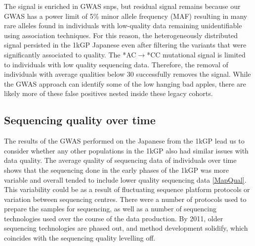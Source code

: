 \documentclass[9pt,lineno]{elife}
\begin{document}
The signal is enriched in GWAS snps, but residual signal remains because our GWAS has a power limit of 5\% minor allele frequency (MAF) resulting in many rare alleles found in individuals with low-quality data remaining unidentifiable using association techniques.
For this reason, the heterogeneously distributed signal persisted in the 1kGP Japanese even after filtering the variants that were significantly associated to quality.
The *AC${\rightarrow}$*CC mutational signal is limited to individuals with low quality sequencing data.
Therefore, the removal of individuals with average qualities below 30 successfully removes the signal.
While the GWAS approach can identify some of the low hanging bad apples, there are likely more of these false positives nested inside these legacy cohorts.


	\subsection{Sequencing quality over time}
The results of the GWAS performed on the Japanese from the 1kGP lead us to consider whether any other populations in the 1kGP also had similar issues with data quality.
The average quality of sequencing data of individuals over time shows that the sequencing done in the early phases of the 1kGP was more variable and overall tended to include lower quality sequencing data \ref{MapQual}.
This variability could be as a result of fluctuating sequence platform protocols or variation between sequencing centres.
There were a number of protocols used to prepare the samples for sequencing, as well as a number of sequencing technologies used over the course of the data production.
By 2011, older sequencing technologies are phased out, and method development solidify, which coincides with the sequencing quality levelling off.
\end{document}
